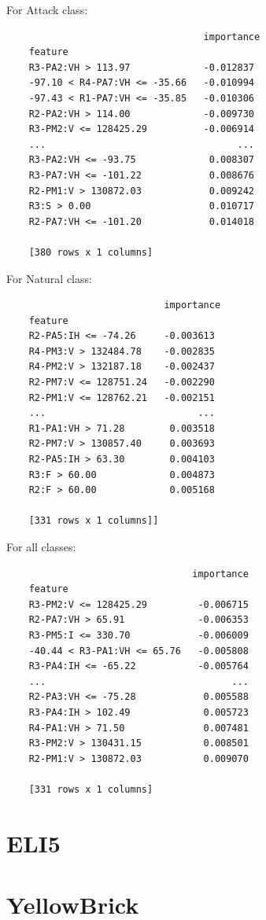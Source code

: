 For Attack class:
\begin{verbatim}
                                   importance
    feature                                 
    R3-PA2:VH > 113.97             -0.012837
    -97.10 < R4-PA7:VH <= -35.66   -0.010994
    -97.43 < R1-PA7:VH <= -35.85   -0.010306
    R2-PA2:VH > 114.00             -0.009730
    R3-PM2:V <= 128425.29          -0.006914
    ...                                  ...
    R3-PA2:VH <= -93.75             0.008307
    R3-PA7:VH <= -101.22            0.008676
    R2-PM1:V > 130872.03            0.009242
    R3:S > 0.00                     0.010717
    R2-PA7:VH <= -101.20            0.014018
    
    [380 rows x 1 columns]
\end{verbatim}

For Natural class: 
\begin{verbatim}
                            importance
    feature                          
    R2-PA5:IH <= -74.26     -0.003613
    R4-PM3:V > 132484.78    -0.002835
    R4-PM2:V > 132187.18    -0.002437
    R2-PM7:V <= 128751.24   -0.002290
    R2-PM1:V <= 128762.21   -0.002151
    ...                           ...
    R1-PA1:VH > 71.28        0.003518
    R2-PM7:V > 130857.40     0.003693
    R2-PA5:IH > 63.30        0.004103
    R3:F > 60.00             0.004873
    R2:F > 60.00             0.005168
    
    [331 rows x 1 columns]]
\end{verbatim}

For all classes:
\begin{verbatim}
                                 importance
    feature                                
    R3-PM2:V <= 128425.29         -0.006715
    R2-PA7:VH > 65.91             -0.006353
    R3-PM5:I <= 330.70            -0.006009
    -40.44 < R3-PA1:VH <= 65.76   -0.005808
    R3-PA4:IH <= -65.22           -0.005764
    ...                                 ...
    R2-PA3:VH <= -75.28            0.005588
    R3-PA4:IH > 102.49             0.005723
    R4-PA1:VH > 71.50              0.007481
    R3-PM2:V > 130431.15           0.008501
    R2-PM1:V > 130872.03           0.009070
    
    [331 rows x 1 columns]
\end{verbatim}
\section{ELI5}

\section{YellowBrick}

